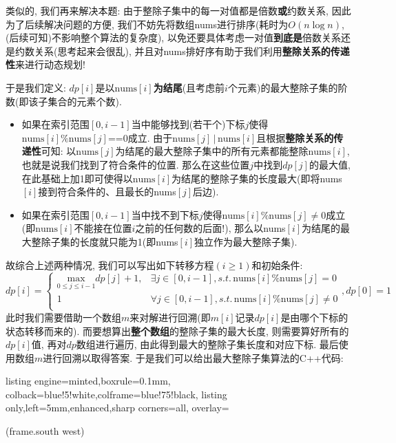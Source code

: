 \documentclass{article}
\begin{document}
\begin{homeworkProblem}
    类似的, 我们再来解决本题: 由于整除子集中的每一对值都是倍数\textbf{或}约数关系, 因此为了后续解决问题的方便, 我们不妨先将数组nums进行排序(耗时为$O(n\log n)$, (后续可知)不影响整个算法的复杂度), 以免还要具体考虑一对值\textbf{到底是}倍数关系还是约数关系(思考起来会很乱), 并且对nums排好序有助于我们利用\textbf{整除关系的传递性}来进行动态规划! 
    
    于是我们定义: $dp[i]$是以$\text{nums}[i]$\textbf{为结尾}(且考虑前$i$个元素)的最大整除子集的阶数(即该子集合的元素个数).
    \begin{itemize}
        \item 如果在索引范围$[0,i-1]$当中能够找到(若干个)下标$j$使得$\text{nums}[i] \% \text{nums}[j]\text{==}0$成立. 由于$\text{nums}[j]\,|\,\text{nums}[i]$且根据\textbf{整除关系的传递性}可知: 以$\text{nums}[j]$为结尾的最大整除子集中的所有元素都能整除$\text{nums}[i]$, 也就是说我们找到了符合条件的位置. 那么在这些位置$j$中找到$dp[j]$的最大值, 在此基础上加1即可使得以$\text{nums}[i]$为结尾的整除子集的长度最大(即将nums$[i]$接到符合条件的、且最长的nums$[j]$后边).
        \item 如果在索引范围$[0,i-1]$当中找不到下标$j$使得$\text{nums}[i] \% \text{nums}[j]\neq 0$成立(即$\text{nums}[i]$不能接在位置$i$之前的任何数的后面!), 那么以nums$[i]$为结尾的最大整除子集的长度就只能为1(即nums$[i]$独立作为最大整除子集).
    \end{itemize}
    故综合上述两种情况, 我们可以写出如下转移方程$(i\geq 1)$和初始条件:
    $$
    dp\left[ i \right] =\left\{ \begin{matrix}
        \underset{0\le j\le i-1}{\text{max}}dp\left[ j \right] +1,&		\exists j\in \left[ 0,i-1 \right] , s.t.\, \text{nums}\left[ i \right] \%\text{nums}\left[ j \right] =0\\
        1&		\forall j\in \left[ 0,i-1 \right] , s.t. \,\text{nums}\left[ i \right] \%\text{nums}\left[ j \right] \ne 0\\
    \end{matrix} \right. , dp\left[ 0 \right] =1
    $$
    此时我们需要借助一个数组$m$来对解进行回溯(即$m[i]$记录$dp[i]$是由哪个下标的状态转移而来的). 而要想算出\textbf{整个数组}的整除子集的最大长度, 则需要算好所有的$dp[i]$值, 再对$dp$数组进行遍历, 由此得到最大的整除子集长度和对应下标. 最后使用数组$m$进行回溯以取得答案. 于是我们可以给出最大整除子集算法的C++代码:
\begin{tcblisting}{listing engine=minted,boxrule=0.1mm,
colback=blue!5!white,colframe=blue!75!black,
listing only,left=5mm,enhanced,sharp corners=all,
overlay={\begin{tcbclipinterior} (frame.south west)

\end{tcbclipinterior}}}
\end{tcblisting}
\end{homeworkProblem}
\end{document}
